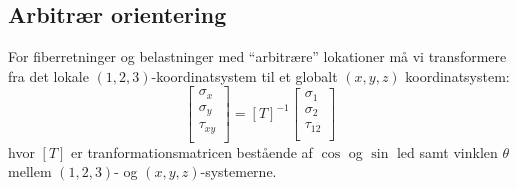 

\subsection{Arbitrær orientering}
For fiberretninger og belastninger med ``arbitrære'' lokationer må vi transformere fra det lokale $(1,2,3)$-koordinatsystem til et globalt $(x,y,z)$ koordinatsystem:
\begin{equation*}
  \begin{bmatrix}
    \sigma_x\\
  \sigma_y\\
  \tau_{xy}\\
\end{bmatrix} = [T]^{-1} \begin{bmatrix}
  \sigma_1\\
\sigma_2\\
\tau_{12}\\
\end{bmatrix}
\end{equation*}
hvor $\left[ T \right]$ er tranformationsmatricen bestående af $\cos$ og $\sin$ led samt vinklen $\theta$ mellem $(1,2,3)$- og $(x,y,z)$-systemerne.

